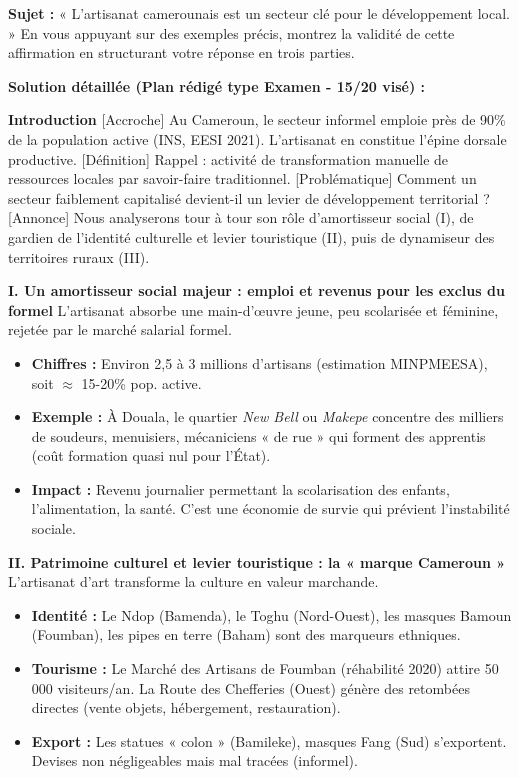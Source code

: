\documentclass[11pt]{article}
\newcommand{\cle}[1]{{\popxbold\color{popdark}#1}}
\begin{document}
\begin{exoresolu}
\textbf{Sujet :} « L'artisanat camerounais est un secteur clé pour le développement local. » En vous appuyant sur des exemples précis, montrez la validité de cette affirmation en structurant votre réponse en trois parties.

\tcblower
\textbf{Solution détaillée (Plan rédigé type Examen - 15/20 visé) :}

\textbf{Introduction}
[Accroche] Au Cameroun, le secteur informel emploie près de 90\% de la population active (INS, EESI 2021). L'artisanat en constitue l'épine dorsale productive.
[Définition] Rappel : activité de transformation manuelle de ressources locales par savoir-faire traditionnel.
[Problématique] Comment un secteur faiblement capitalisé devient-il un levier de développement territorial ?
[Annonce] Nous analyserons tour à tour son rôle d'amortisseur social (I), de gardien de l'identité culturelle et levier touristique (II), puis de dynamiseur des territoires ruraux (III).

\textbf{I. Un amortisseur social majeur : emploi et revenus pour les exclus du formel}
L'artisanat absorbe une main-d'œuvre jeune, peu scolarisée et féminine, rejetée par le marché salarial formel.
\begin{itemize}
    \item \textbf{Chiffres :} Environ 2,5 à 3 millions d'artisans (estimation MINPMEESA), soit $\approx$ 15-20\% pop. active.
    \item \textbf{Exemple :} À Douala, le quartier \textit{New Bell} ou \textit{Makepe} concentre des milliers de soudeurs, menuisiers, mécaniciens « de rue » qui forment des apprentis (coût formation quasi nul pour l'État).
    \item \textbf{Impact :} Revenu journalier permettant la scolarisation des enfants, l'alimentation, la santé. C'est une \cle{économie de survie} qui prévient l'instabilité sociale.
\end{itemize}

\textbf{II. Patrimoine culturel et levier touristique : la « marque Cameroun »}
L'artisanat d'art transforme la culture en valeur marchande.
\begin{itemize}
    \item \textbf{Identité :} Le \cle{Ndop} (Bamenda), le \cle{Toghu} (Nord-Ouest), les \cle{masques Bamoun} (Foumban), les \cle{pipes en terre} (Baham) sont des marqueurs ethniques.
    \item \textbf{Tourisme :} Le \cle{Marché des Artisans de Foumban} (réhabilité 2020) attire 50 000 visiteurs/an. La \cle{Route des Chefferies} (Ouest) génère des retombées directes (vente objets, hébergement, restauration).
    \item \textbf{Export :} Les statues « colon » (Bamileke), masques Fang (Sud) s'exportent. Devises non négligeables mais mal tracées (informel).
\end{itemize}


\end{exoresolu}
\end{document}
